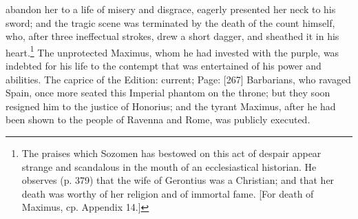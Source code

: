 abandon her to a life of misery and disgrace, eagerly presented her neck to his sword; and the tragic scene was terminated by the death of the count himself, who, after three ineffectual strokes, drew a short dagger, and sheathed it in his heart.\footnote{The praises which Sozomen has bestowed on this act of despair appear strange and scandalous in the mouth of an ecclesiastical historian. He observes (p. 379) that the wife of Gerontius was a Christian; and that her death was worthy of her religion and of immortal fame. [For death of Maximus, cp. Appendix 14.]} The unprotected Maximus, whom he had invested with the purple, was indebted for his life to the contempt that was entertained of his power and abilities. The caprice of the Edition: current; Page: [267] Barbarians, who ravaged Spain, once more seated this Imperial phantom on the throne; but they soon resigned him to the justice of Honorius; and the tyrant Maximus, after he had been shown to the people of Ravenna and Rome, was publicly executed.

